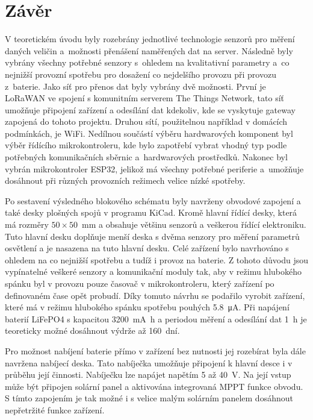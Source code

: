 \chapter*{Závěr}
{}

V teoretickém úvodu byly rozebrány jednotlivé technologie senzorů pro měření daných veličin a~možnosti přenášení naměřených dat na server. Následně byly vybrány všechny potřebné senzory s~ohledem na kvalitativní parametry a~co nejnižší provozní spotřebu pro dosažení co nejdelšího provozu při provozu z~baterie. Jako síť pro přenos dat byly vybrány dvě možnosti. První je LoRaWAN ve spojení s komunitním serverem The Things Network, tato síť umožňuje připojení zařízení a odesílání dat kdekoliv, kde se vyskytuje gateway zapojená do tohoto projektu. Druhou sítí, použitelnou například v domácích podmínkách, je WiFi. Nedílnou součástí výběru hardwarových komponent byl výběr řídícího mikrokontroleru, kde bylo zapotřebí vybrat vhodný typ podle potřebných komunikačních sběrnic a~hardwarových prostředků. Nakonec byl vybrán mikrokontroler ESP32, jelikož má všechny potřebné periferie a~umožňuje dosáhnout při různých provozních režimech velice nízké spotřeby.

Po sestavení výsledného blokového schématu byly navrženy obvodové zapojení a také desky plošných spojů v programu KiCad. Kromě hlavní řídící desky, která má rozměry $50 \times 50$\SI{}{\milli\metre} a obsahuje většinu senzorů a veškerou řídící elektroniku. Tuto hlavní desku doplňuje menší deska s dvěma senzory pro měření parametrů osvětlení a je nasazena na tuto hlavní desku. Celé zařízení bylo navrhováno s ohledem na co nejnižší spotřebu a tudíž i provoz na baterie. Z tohoto důvodu jsou vypínatelné veškeré senzory a komunikační moduly tak, aby v režimu hlubokého spánku byl v provozu pouze časovač v mikrokontroleru, který zařízení po definovaném čase opět probudí. Díky tomuto návrhu se podařilo vyrobit zařízení, které má v režimu hlubokého spánku spotřebu pouhých \SI{5.8}{\micro\ampere}. Při napájení baterií LiFePO4 s kapacitou \SI{3200}{\milli\ampere\hour} a periodou měření a odesílání dat \SI{1}{\hour} je teoreticky možné dosáhnout výdrže až 160~dní.

Pro možnost nabíjení baterie přímo v zařízení bez nutnosti jej rozebírat byla dále navržena nabíjecí deska. Tato nabíječka umožňuje připojení k hlavní desce i v průběhu její činnosti. Nabíječku lze napájet napětím \SI{5}{} až \SI{40}{\volt}. Na její vstup může být připojen solární panel a aktivována integrovaná MPPT funkce obvodu. S tímto zapojením je tak možné i s velice malým solárním panelem dosáhnout nepřetržité funkce zařízení.

